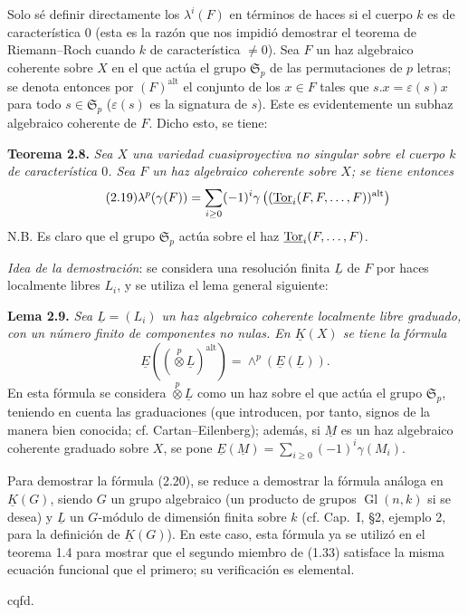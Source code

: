 Solo sé definir directamente los $\lambda^i(F)$ en términos de haces si el cuerpo $k$ es de característica $0$ (esta es la razón que nos impidió demostrar el teorema de Riemann--Roch cuando $k$  de característica $\neq0$). Sea $F$ un haz algebraico coherente sobre $X$ en el que actúa el grupo $\mathfrak S_p$ de las permutaciones de $p$ letras; se denota entonces por $(F)^{\mathrm{alt}}$ el conjunto de los $x\in F$ tales que $s.x=\varepsilon(s)x$ para todo $s\in\mathfrak S_p$ ($\varepsilon(s)$ es la signatura de $s$). Este es evidentemente un subhaz algebraico coherente de $F$. Dicho esto, se tiene:

\textbf{Teorema 2.8.} \emph{Sea $X$ una variedad cuasiproyectiva no singular sobre el cuerpo $k$ de característica $0$. Sea $F$ un haz algebraico coherente sobre $X$; se tiene entonces}
\begin{equation}\tag{2.19}
 \lambda^p(\gamma(F))=\sum_{i\geq0}(-1)^i\gamma\left((\underline{\operatorname{Tor}}_i(F,F,\ldots,F))^{\mathrm{alt}}\right)
\end{equation}
N.B. Es claro que el grupo $\mathfrak S_p$ actúa sobre el haz $\underline{\operatorname{Tor}}_i(F,\ldots,F)$.

\emph{Idea de la demostración}: se considera una resolución finita $\underline L$ de $F$ por haces localmente libres $L_i$, y se utiliza el lema general siguiente:

\textbf{Lema 2.9.} \emph{Sea $\underline L=(L_i)$ un haz algebraico coherente localmente libre graduado, con un número finito de componentes no nulas. En $\underline K(X)$ se tiene la fórmula}
\begin{equation}\tag{2.20}
 \underline E\left((\overset{p}{\otimes}\underline L)^{\mathrm{alt}}\right)=\wedge^p(\underline E(\underline L)).
\end{equation}
En esta fórmula se considera $\overset{p}{\otimes}\underline L$ como un haz sobre el que actúa el grupo $\mathfrak S_p$, teniendo en cuenta las graduaciones (que introducen, por tanto, signos de la manera bien conocida; cf. Cartan--Eilenberg); además, si $\underline M$ es un haz algebraico coherente graduado sobre $X$, se pone $\underline E(\underline M)=\sum_{i\geq0}(-1)^i\gamma(M_i)$.

Para demostrar la fórmula (2.20), se reduce a demostrar la fórmula análoga en $\underline K(G)$, siendo $G$ un grupo algebraico (un producto de grupos $\operatorname{Gl}(n,k)$ si se desea) y $\underline L$ un $G$-módulo de dimensión finita sobre $k$ (cf. Cap.\ I, \S 2, ejemplo 2, para la definición de $\underline K(G)$). En este caso, esta fórmula ya se utilizó en el teorema 1.4 para mostrar que el segundo miembro de (1.33) satisface la misma ecuación funcional que el primero; su verificación es elemental.
\begin{flushright}cqfd.\end{flushright}

